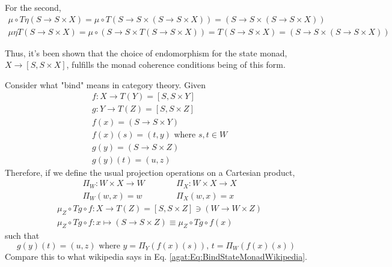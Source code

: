 For the second, 
\[
\begin{gathered}
\mu \circ T \eta (S\to S \times X) = \mu \circ T (S \to S \times (S \to S \times X)) = (S \to S \times (S \to S \times X)) \\
\mu \eta T (S\to S \times X) = \mu \circ (S \to S \times T(S \to S \times X)) = T(S \to S \times X) = (S \to S \times (S \to S \times X))
\end{gathered}
\]

\[
\]
Thus, it's been shown that the choice of endomorphism for the state monad, $X \to [S, S \times X]$, fulfills the monad coherence conditions being of this form.












Consider what "bind" means in category theory. Given
\begin{equation}
\begin{aligned}
& f:X \to T(Y) = [S, S \times Y] \\ 
& g: Y \to T(Z) = [S, S\times Z] \\ 
& f(x) = (S \to S\times Y) \\
& f(x)(s) = (t, y) \text{ where } s, t \in W \\ 
& g(y) = (S \to S \times Z) \\ 
& g(y)(t) = (u, z)
\end{aligned}
\end{equation}
Therefore, if we define the usual projection operations on a Cartesian product,
\begin{equation}
\begin{aligned}
& \Pi_W : W \times X \to W \\
& \Pi_W(w,x) = w
\end{aligned} \qquad \, 
\begin{aligned}
& \Pi_X : W \times X \to X \\
& \Pi_X(w,x) = x
\end{aligned}
\end{equation}
\begin{equation}
\begin{aligned}
& \mu_Z \circ Tg \circ f : X \to T(Z) = [S, S\times Z] \ni (W \to W \times Z) \\ 
& \mu_Z \circ Tg \circ f : x \mapsto (S \to S \times Z) \equiv \mu_Z \circ Tg \circ f(x)
\end{aligned}
\end{equation}
such that 
\begin{equation}
\boxed{ g(y)(t) = (u,z) \text{ where } y = \Pi_Y(f(x)(s)), \, t = \Pi_W(f(x)(s)) }
\end{equation}
Compare this to what wikipedia says in Eq. \ref{agat:Eq:BindStateMonadWikipedia}.

